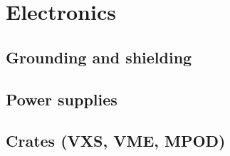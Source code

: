 \section{Electronics}

\subsection{Grounding and shielding}
\subsection{Power supplies}
\subsection{Crates (VXS, VME, MPOD)}
